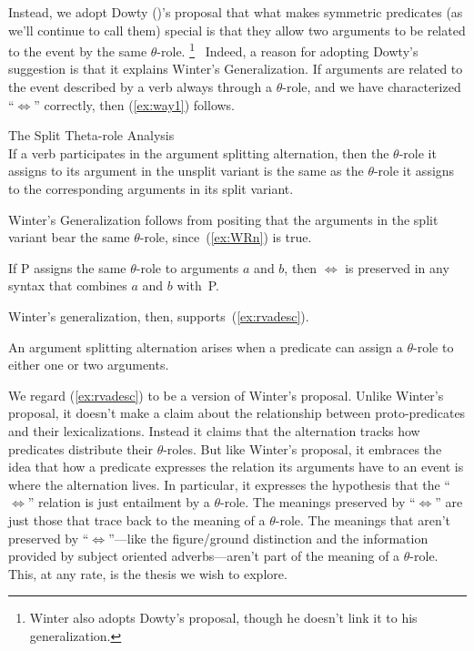 \documentclass[twoside, 12pt]{article}
\begin{document}
Instead, we adopt Dowty (\citeyear{Dowty:1989, Dowty:1991})'s proposal that what makes symmetric predicates (as we'll continue to call them) special is that they allow two arguments to be related to the event by the same $\theta$-role.%
%
\footnote{Winter also adopts Dowty's proposal, though he doesn't link it to his generalization.}%
%
\ Indeed, a reason for adopting Dowty's suggestion is that it explains Winter's Generalization. If arguments are related to the event described by a verb always through a $\theta$-role, and we have characterized ``$\Leftrightarrow$'' correctly, then (\ref{ex:way1}) follows.
\begin{exe}
\raggedright
  \ex \label{ex:way1} The Split Theta-role Analysis\\
  If a verb participates in the argument splitting alternation, then the $\theta$-role it assigns to its argument in the unsplit variant is the same as the $\theta$-role it assigns to the corresponding arguments in its split variant.
\end{exe}
Winter's Generalization follows from positing that the arguments in the split variant bear the same $\theta$-role, since~(\ref{ex:WRn}) is true.
\begin{exe}
\raggedright
  \ex \label{ex:WRn} If P assigns the same $\theta$-role to arguments $a$ and $b$, then $\Leftrightarrow$ is preserved in any syntax that combines $a$ and $b$ with~P.
\end{exe}
Winter's generalization, then, supports~(\ref{ex:rvadesc}).
\begin{exe}
\raggedright
  \ex \label{ex:rvadesc}
  An argument splitting alternation arises when a predicate can assign a $\theta$-role to either one or two arguments.
\end{exe}
We regard (\ref{ex:rvadesc}) to be a version of Winter's proposal. Unlike Winter's proposal, it doesn't make a claim about the relationship between proto-predicates and their lexicalizations. Instead it claims that the alternation tracks how predicates distribute their $\theta$-roles. But like Winter's proposal, it embraces the idea that how a predicate expresses the relation its arguments have to an event is where the alternation lives. In particular, it expresses the hypothesis that the ``$\Leftrightarrow$'' relation is just entailment by a $\theta$-role. The meanings preserved by ``$\Leftrightarrow$'' are just those that trace back to the meaning of a $\theta$-role. The meanings that aren't preserved by ``$\Leftrightarrow$''---like the figure/ground distinction and the information provided by subject oriented adverbs---aren't part of the meaning of a $\theta$-role. This, at any rate, is the thesis we wish to explore.
\end{document}
